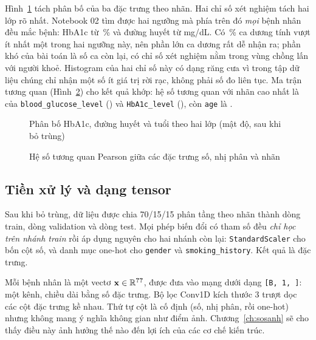 Hình~\ref{fig:diabhist} tách phân bố của ba đặc trưng theo nhãn. Hai chỉ số xét nghiệm tách hai lớp rõ nhất. Notebook 02
tìm được hai ngưỡng mà phía trên đó \emph{mọi} bệnh nhân đều mắc bệnh: HbA1c từ \,\%
và đường huyết từ  mg/dL. Có \,\% ca dương
tính vượt ít nhất một trong hai ngưỡng này, nên phần lớn ca dương rất dễ nhận ra; phần khó của bài toán là số ca còn lại,
có chỉ số xét nghiệm nằm trong vùng chồng lấn với người khoẻ. Histogram của hai chỉ số này có dạng răng cưa vì trong
tập dữ liệu chúng chỉ nhận một số ít giá trị rời rạc, không phải số đo liên tục. Ma trận tương quan (Hình~\ref{fig:diabcorr}) cho kết quả khớp: hệ số tương quan với nhãn cao
nhất là của \texttt{blood\_glucose\_level} () và \texttt{HbA1c\_level}
(), còn \texttt{age} là .

\begin{figure}[H]
  \centering
  \caption{Phân bố HbA1c, đường huyết và tuổi theo hai lớp (mật độ, sau khi bỏ trùng)}
  \label{fig:diabhist}
\end{figure}

\begin{figure}[H]
  \centering
  \caption{Hệ số tương quan Pearson giữa các đặc trưng số, nhị phân và nhãn}
  \label{fig:diabcorr}
\end{figure}

\subsection{Tiền xử lý và dạng tensor}

Sau khi bỏ trùng, dữ liệu được chia 70/15/15 phân tầng theo nhãn thành  dòng train,
 dòng validation và  dòng test. Mọi phép biến đổi có tham số đều
\emph{chỉ học trên nhánh train} rồi áp dụng nguyên cho hai nhánh còn lại: \texttt{StandardScaler} cho bốn cột số, và danh
mục one-hot cho \texttt{gender} và \texttt{smoking\_history}. Kết quả là  đặc trưng.


Mỗi bệnh nhân là một vectơ $\mathbf{x}\in\mathbb{R}^{\SL{data/diabetes/n_features_encoded}}$, được đưa vào mạng dưới dạng
\texttt{[B, 1, ]}: một kênh, chiều dài bằng số đặc trưng. Bộ lọc Conv1D kích thước 3
trượt dọc các cột đặc trưng kề nhau. Thứ tự cột là cố định (số, nhị phân, rồi one-hot) nhưng không mang ý nghĩa không gian
như điểm ảnh. Chương~\ref{ch:sosanh} sẽ cho thấy điều này ảnh hưởng thế nào đến lợi ích của các cơ chế kiến trúc.
